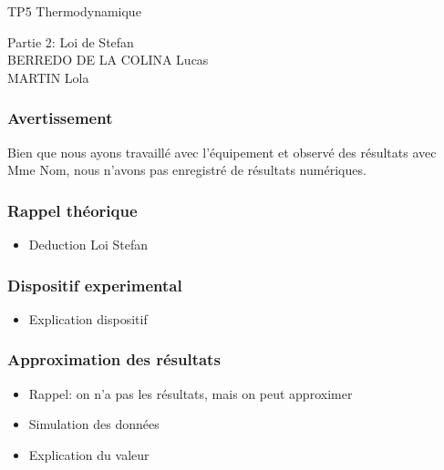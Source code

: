 \documentclass{beamer}
\begin{document}
\begin{frame}

\Huge{TP5 Thermodynamique}

\Large{Partie 2: Loi de Stefan}
\\[2em]
\large{BERREDO DE LA COLINA Lucas\\ MARTIN Lola}

\end{frame}





\begin{frame}
\frametitle{Avertissement}
Bien que nous ayons travaillé avec l'équipement et observé des résultats avec {\color{red} Mme Nom}, nous n'avons pas enregistré de résultats numériques.
\end{frame}





\begin{frame}
\frametitle{Rappel théorique}

\begin{itemize}
	\item{Deduction Loi Stefan}

\end{itemize}

\end{frame}





\begin{frame}
\frametitle{Dispositif experimental}

\begin{itemize}
	\item{Explication dispositif}
	
\end{itemize}	
	
\end{frame}





\begin{frame}
\frametitle{Approximation des résultats}

\begin{itemize}
	\item{Rappel: on n'a pas les résultats, mais on peut approximer}
	\item{Simulation des données}
	\item{Explication du valeur}
	
\end{itemize}
\end{frame}
\end{document}
